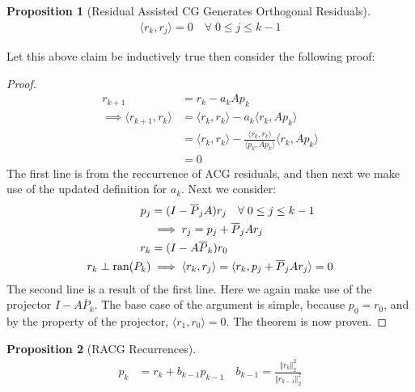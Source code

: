 \documentclass[]{article}
\theoremstyle{definition}
\newtheorem{prop}{Proposition}[section]  %
\begin{document}
            \begin{prop}[Residual Assisted CG Generates Orthogonal Residuals]\label{prop:1.6}
                \begin{align}
                    \langle r_k , r_j \rangle = 0 \quad \forall\; 0 \le j \le k - 1 
                \end{align}
            \end{prop}
            \noindent
            Let this above claim be inductively true then consider the following proof: 
            \begin{proof}
                \begin{align}
                    r_{k + 1} &= r_k - a_kAp_k
                    \\
                    \implies 
                    \langle r_{k + 1}, r_k\rangle &= \langle r_k, r_k\rangle - 
                    a_k \langle r_k, Ap_k\rangle
                    \\
                    &= \langle r_k, r_k\rangle - 
                    \frac{\langle r_k, r_k\rangle}{\langle p_k, Ap_k\rangle}
                    \langle r_k, Ap_k\rangle
                    \\
                    &= 
                    0
                \end{align}
                The first line is from the reccurrence of ACG residuals, and then next we make use of the updated definition for $a_k$. Next we consider: 
                \begin{align}
                    p_j &= (I - \overline{P}_jA)r_j \quad \forall\; 0\le j \le k - 1
                    \\
                    \hspace{1.1em} & \implies r_j = p_j + \overline{P}_jAr_j
                    \\
                    r_k &= (I - A\overline{P}_k)r_0
                    \\
                    r_k\perp \text{ran}(P_k) & \implies 
                    \langle r_k, r_j\rangle =\langle r_k, p_j + \overline{P}_jAr_j\rangle = 0
                \end{align}
                The second line is a result of the first line. Here we again make use of the projector $I - A \overline{P}_k$. The base case of the argument is simple, because $p_0 = r_0$, and by the property of the projector, $\langle r_1, r_0\rangle = 0$. The theorem is now proven. 
            \end{proof}
            \begin{prop}[RACG Recurrences]
                \begin{align}
                    p_k &= r_k + b_{k - 1}p_{k - 1} \quad b_{k - 1} = \frac{\Vert r_k\Vert_2^2}
                    {\Vert r_{k - 1}\Vert_2^2}
                \end{align}
            \end{prop}
\end{document}

